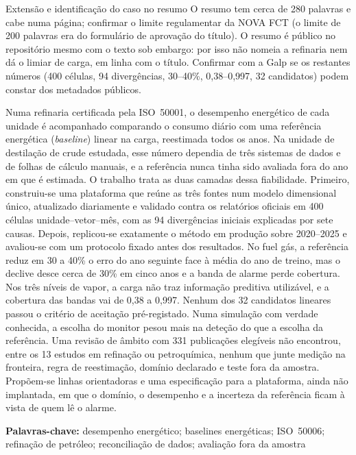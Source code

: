 
{Extensão e identificação do caso no resumo}
{O resumo tem cerca de 280 palavras e cabe numa página; confirmar o
limite regulamentar da NOVA FCT (o limite de 200 palavras era do
formulário de aprovação do título). O resumo é público no repositório
mesmo com o texto sob embargo: por isso não nomeia a refinaria nem dá o
limiar de carga, em linha com o título. Confirmar com a Galp se os
restantes números (400 células, 94 divergências, 30--40\%, 0,38--0,997,
32 candidatos) podem constar dos metadados públicos.}%

Numa refinaria certificada pela ISO~50001, o desempenho energético de cada
unidade é acompanhado comparando o consumo diário com uma referência
energética (\emph{baseline}) linear na carga, reestimada todos os anos. Na
unidade de destilação de crude estudada, esse número dependia de três
sistemas de dados e de folhas de cálculo manuais, e a referência nunca tinha
sido avaliada fora do ano em que é estimada. O trabalho trata as duas
camadas dessa fiabilidade. Primeiro, construiu-se uma plataforma que reúne as
três fontes num modelo dimensional único, atualizado diariamente e validado
contra os relatórios oficiais em 400 células unidade--vetor--mês, com as 94
divergências iniciais explicadas por sete causas. Depois, replicou-se
exatamente o método em produção sobre 2020--2025 e avaliou-se com um
protocolo fixado antes dos resultados. No fuel gás, a referência reduz em 30
a 40\% o erro do ano seguinte face à média do ano de treino, mas o declive
desce cerca de 30\% em cinco anos e a banda de alarme perde cobertura. Nos
três níveis de vapor, a carga não traz informação preditiva utilizável, e a
cobertura das bandas vai de 0,38 a 0,997. Nenhum dos 32 candidatos lineares
passou o critério de aceitação pré-registado. Numa simulação com verdade
conhecida, a escolha do monitor pesou mais na deteção do que a escolha da
referência. Uma revisão de âmbito com 331 publicações elegíveis não
encontrou, entre os 13 estudos em refinação ou petroquímica, nenhum que
junte medição na fronteira, regra de reestimação, domínio declarado e teste
fora da amostra. Propõem-se linhas orientadoras e uma especificação para a
plataforma, ainda não implantada, em que o domínio, o desempenho e a
incerteza da referência ficam à vista de quem lê o alarme.

\bigskip
\noindent\textbf{Palavras-chave:} desempenho energético; baselines
energéticas; ISO~50006; refinação de petróleo; reconciliação de dados;
avaliação fora da amostra
